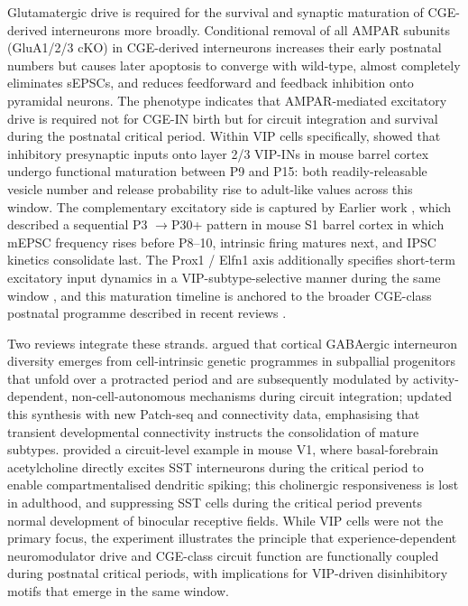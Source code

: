\documentclass[11pt]{article}
\let\origrightarrow\rightarrow
\def\rightarrow{\ensuremath{\origrightarrow}}
\begin{document}
Glutamatergic drive is required for the survival and synaptic maturation of CGE-derived interneurons more broadly. Conditional removal of all AMPAR subunits (GluA1/2/3 cKO) in CGE-derived interneurons increases their early postnatal numbers but causes later apoptosis to converge with wild-type, almost completely eliminates sEPSCs, and reduces feedforward and feedback inhibition onto pyramidal neurons. The phenotype indicates that AMPAR-mediated excitatory drive is required not for CGE-IN birth but for circuit integration and survival during the postnatal critical period. Within VIP cells specifically, \citet{Simacek2025a} showed that inhibitory presynaptic inputs onto layer 2/3 VIP-INs in mouse barrel cortex undergo functional maturation between P9 and P15: both readily-releasable vesicle number and release probability rise to adult-like values across this window. The complementary excitatory side is captured by Earlier work \citep{Simacek2025b}, which described a sequential P3 \rightarrow P30+ pattern in mouse S1 barrel cortex in which mEPSC frequency rises before P8--10, intrinsic firing matures next, and IPSC kinetics consolidate last. The Prox1 / Elfn1 axis additionally specifies short-term excitatory input dynamics in a VIP-subtype-selective manner during the same window \citep{Stachniak2021}, and this maturation timeline is anchored to the broader CGE-class postnatal programme described in recent reviews \citep{Lim2018, Demarcogarcia2025}.

Two reviews integrate these strands. \citet{Lim2018} argued that cortical GABAergic interneuron diversity emerges from cell-intrinsic genetic programmes in subpallial progenitors that unfold over a protracted period and are subsequently modulated by activity-dependent, non-cell-autonomous mechanisms during circuit integration; \citet{Demarcogarcia2025} updated this synthesis with new Patch-seq and connectivity data, emphasising that transient developmental connectivity instructs the consolidation of mature subtypes. \citet{Yaeger2019} provided a circuit-level example in mouse V1, where basal-forebrain acetylcholine directly excites SST interneurons during the critical period to enable compartmentalised dendritic spiking; this cholinergic responsiveness is lost in adulthood, and suppressing SST cells during the critical period prevents normal development of binocular receptive fields. While VIP cells were not the primary focus, the experiment illustrates the principle that experience-dependent neuromodulator drive and CGE-class circuit function are functionally coupled during postnatal critical periods, with implications for VIP-driven disinhibitory motifs that emerge in the same window.
\end{document}
